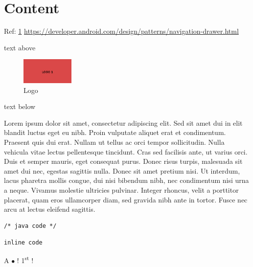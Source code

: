 \chapter{Content}
\label{chap:back-end}
Ref: \ref{chap:back-end}
\url{https://developer.android.com/design/patterns/navigation-drawer.html}

text above

\begin{figure}
  \vspace{-20pt}
  \begin{center}
    \includegraphics[width=0.23\textwidth]{logo1.jpg}
  \end{center}
  \vspace{-20pt}
  \caption{Logo}
\end{figure}

text below

Lorem ipsum dolor sit amet, consectetur adipiscing elit. Sed sit amet dui in elit blandit luctus eget eu nibh. Proin vulputate aliquet erat et condimentum. Praesent quis dui erat. Nullam ut tellus ac orci tempor sollicitudin. Nulla vehicula vitae lectus pellentesque tincidunt. Cras sed facilisis ante, ut varius orci. Duis et semper mauris, eget consequat purus. Donec risus turpis, malesuada sit amet dui nec, egestas sagittis nulla. Donec sit amet pretium nisi. Ut interdum, lacus pharetra mollis congue, dui nisi bibendum nibh, nec condimentum nisi urna a neque. Vivamus molestie ultricies pulvinar. Integer rhoncus, velit a porttitor placerat, quam eros ullamcorper diam, sed gravida nibh ante in tortor. Fusce nec arcu at lectus eleifend sagittis.

\java
\begin{lstlisting}
/* java code */
\end{lstlisting}

\lstinline{inline code}
%


A $\bullet$ !
\vfill
\null
\hfill 1\textsuperscript{st} ! \hfill
\null
\vfill
